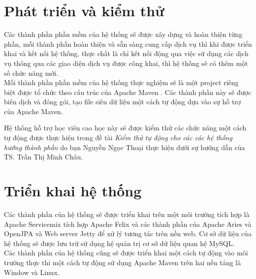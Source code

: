 \section{Phát triển và kiểm thử}
Các thành phần phần mềm của hệ thống sẽ được xây dựng và hoàn thiện từng phần, mỗi thành phần hoàn thiện và sẵn sàng cung cấp dịch vụ thì khi được triển khai và kết nối hệ thống, thực chất là chỉ kết nối động qua việc sử dụng các dịch vụ thông qua các giao diện dịch vụ được công khai, thì hệ thống sẽ có thêm một số chức năng mới. \\

Mỗi thành phần phần mềm của hệ thống thực nghiệm sẽ là một project riêng biệt được tổ chức theo cấu trúc của Apache Maven \cite{maven}. Các thành phần này sẽ được biên dịch và đóng gói, tạo file siêu dữ liệu một cách tự động dựa vào sự hỗ trợ của Apache Maven.  

Hệ thống hỗ trợ học viên cao học này sẽ được kiểm thử các chức năng một cách tự động được thực hiện trong đề tài 
\textit{Kiểm thử tự động cho các các hệ thống hướng thành phần} do bạn Nguyễn Ngọc Thoại thực hiện dưới sự hướng dẫn của TS. Trần Thị Minh Châu. 
\section{Triển khai hệ thống}
Các thành phần của hệ thống sẽ được triển khai trên một môi trường tích hợp là Apache Servicemix \cite{servicemix} tích hợp Apache Felix và các thành phần của Apache Aries và OpenJPA và Web server Jetty \cite{jetty} để xử lý tương tác trên nền web. Cơ sở dữ liệu của hệ thống sẽ được lưu trữ sử dụng hệ quản trị cơ sở dữ liệu quan hệ MySQL.\\

Các thành phần của hệ thống cũng sẽ được triển khai một cách tự động vào môi trường thực thi một cách tự động sử dụng Apache Maven trên hai nền tảng là Window và Linux.

